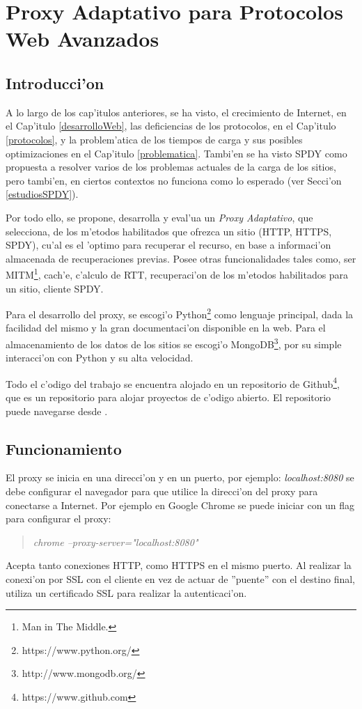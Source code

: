 \chapter{Proxy Adaptativo para Protocolos Web Avanzados}
\label{spdyproxypython}

\section{Introducci'on}

A lo largo de los cap'itulos anteriores, se ha visto, el crecimiento de Internet, en el Cap'itulo \ref{desarrolloWeb}, las deficiencias de los protocolos, en el Cap'itulo \ref{protocolos}, y la problem'atica de los tiempos de carga y sus posibles optimizaciones en el Cap'itulo \ref{problematica}. Tambi'en se ha visto SPDY como propuesta a resolver varios de los problemas actuales de la carga de los sitios, pero tambi'en, en ciertos contextos no funciona como lo esperado (ver Secci'on \ref{estudiosSPDY}).

Por todo ello, se propone, desarrolla y eval'ua un \textit{Proxy Adaptativo}, que selecciona, de los m'etodos habilitados que ofrezca un sitio (HTTP, HTTPS, SPDY), cu'al es el 'optimo para recuperar el recurso, en base a informaci'on almacenada de recuperaciones previas. Posee otras funcionalidades tales como, ser MITM\footnote{Man in The Middle.}, cach'e, c'alculo de RTT, recuperaci'on de los m'etodos habilitados para un sitio, cliente SPDY.

Para el desarrollo del proxy, se escogi'o Python\footnote{https://www.python.org/} como lenguaje principal, dada la facilidad del mismo y la gran documentaci'on disponible en la web. Para el almacenamiento de los datos de los sitios se escogi'o MongoDB\footnote{http://www.mongodb.org/}, por su simple interacci'on con Python y su alta velocidad.

Todo el c'odigo del trabajo se encuentra alojado en un repositorio de Github\footnote{https://www.github.com}, que es un repositorio para alojar proyectos de c'odigo abierto. El repositorio puede navegarse desde \citep{spdyproxypython}.

\section{Funcionamiento}

El proxy se inicia en una direcci'on y en un puerto, por ejemplo: \textit{localhost:8080} se debe configurar el navegador para que utilice la direcci'on del proxy para conectarse a Internet. Por ejemplo en Google Chrome se puede iniciar con un flag para configurar el proxy:
\begin{quote}
\textit{chrome --proxy-server="localhost:8080"}
\end{quote}
Acepta tanto conexiones HTTP, como HTTPS en el mismo puerto. Al realizar la conexi'on por SSL con el cliente en vez de actuar de ''puente'' con el destino final, utiliza un certificado SSL para realizar la autenticaci'on.

